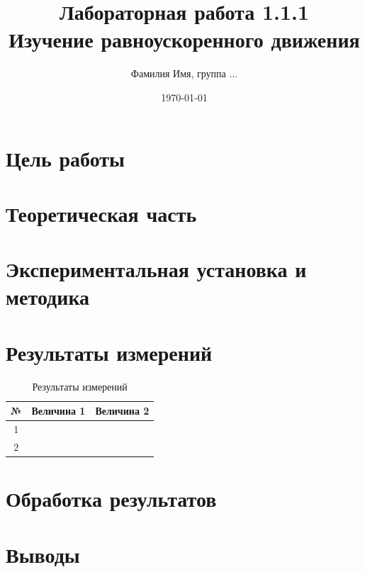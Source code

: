 \documentclass[12pt]{article}
\title{Лабораторная работа 1.1.1 \\ Изучение равноускоренного движения}
\author{Фамилия Имя, группа ...}
\date{\today}
\begin{document}
\maketitle

\section{Цель работы}

\section{Теоретическая часть}

\section{Экспериментальная установка и методика}

\section{Результаты измерений}

\begin{table}[h]
    \centering
    \caption{Результаты измерений}
    \begin{tabular}{ccc}
        \toprule
        № & Величина 1 & Величина 2 \\
        \midrule
        1 & & \\
        2 & & \\
        \bottomrule
    \end{tabular}
\end{table}

\section{Обработка результатов}

\section{Выводы}
\end{document}
